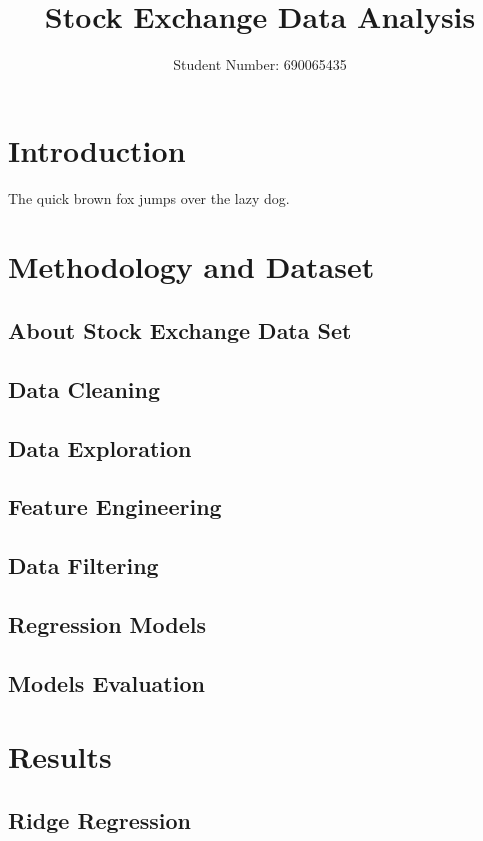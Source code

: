 \documentclass[a4paper, 11pt]{article}
\begin{document}
\title{Stock Exchange Data Analysis}
\author{Student Number: 690065435}
\maketitle

\section{Introduction}
The quick brown fox jumps over the lazy dog.

\section{Methodology and Dataset}

\subsection{About Stock Exchange Data Set}

\subsection{Data Cleaning}

\subsection{Data Exploration}

\subsection{Feature Engineering}

\subsection{Data Filtering}

\subsection{Regression Models}

\subsection{Models Evaluation}

\section{Results}
\subsection{Ridge Regression}
\end{document}
